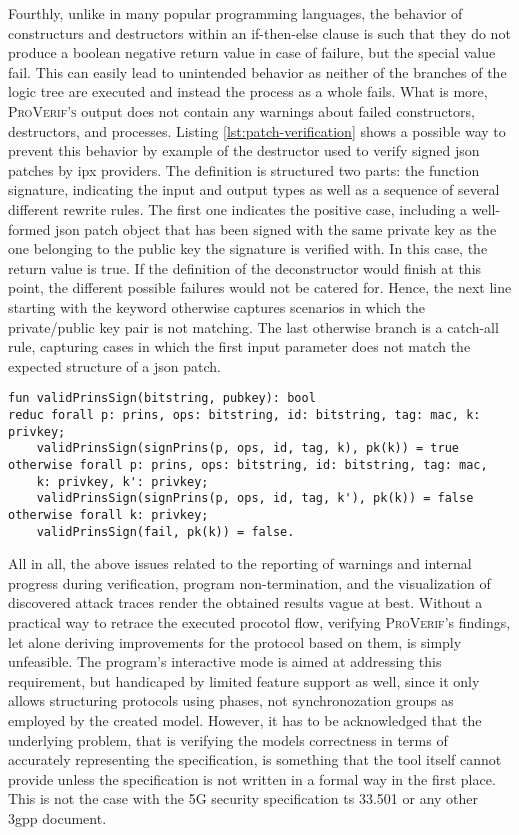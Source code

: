 Fourthly, unlike in many popular programming languages, the behavior of constructurs and destructors within an if-then-else clause is such that they do not produce a boolean negative return value in case of failure, but the special value {\sffamily fail}.
This can easily lead to unintended behavior as neither of the branches of the logic tree are executed and instead the process as a whole fails.
What is more, \textsc{ProVerif's} output does not contain any warnings about failed constructors, destructors, and processes.
Listing \ref{lst:patch-verification} shows a possible way to prevent this behavior by example of the destructor used to verify signed \gls{json} patches by \gls{ipx} providers.
The definition is structured two parts: the function signature, indicating the input and output types as well as a sequence of several different rewrite rules.
The first one indicates the positive case, including a well-formed \gls{json} patch object that has been signed with the same private key as the one belonging to the public key the signature is verified with.
In this case, the return value is true.
If the definition of the deconstructor would finish at this point, the different possible failures would not be catered for.
Hence, the next line starting with the keyword {\sffamily otherwise} captures scenarios in which the private/public key pair is not matching.
The last {\sffamily otherwise} branch is a catch-all rule, capturing cases in which the first input parameter does not match the expected structure of a \gls{json} patch.

\begin{lstlisting}[caption={Custom channel declarations},label={lst:patch-verification},firstnumber=23]
fun validPrinsSign(bitstring, pubkey): bool
reduc forall p: prins, ops: bitstring, id: bitstring, tag: mac, k: privkey;
    validPrinsSign(signPrins(p, ops, id, tag, k), pk(k)) = true
otherwise forall p: prins, ops: bitstring, id: bitstring, tag: mac,
    k: privkey, k': privkey;
    validPrinsSign(signPrins(p, ops, id, tag, k'), pk(k)) = false
otherwise forall k: privkey;
    validPrinsSign(fail, pk(k)) = false.
\end{lstlisting}

All in all, the above issues related to the reporting of warnings and internal progress during verification, program non-termination, and the visualization of discovered attack traces render the obtained results vague at best.
Without a practical way to retrace the executed procotol flow, verifying \textsc{ProVerif}'s findings, let alone deriving improvements for the protocol based on them, is simply unfeasible.
The program's interactive mode is aimed at addressing this requirement, but handicaped by limited feature support as well, since it only allows structuring protocols using phases, not synchronozation groups as employed by the created model.
However, it has to be acknowledged that the underlying problem, that is verifying the models correctness in terms of accurately representing the specification, is something that the tool itself cannot provide unless the specification is not written in a formal way in the first place.
This is not the case with the 5G security specification \gls{ts} 33.501 or any other \gls{3gpp} document.